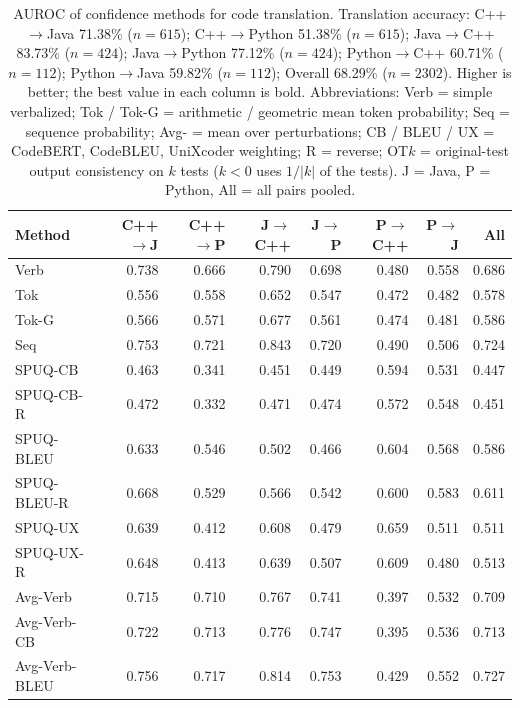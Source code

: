 {\scriptsize
\setlength{\tabcolsep}{2.5pt}
\renewcommand{\arraystretch}{0.95}
\begin{table}[t]
\centering
\caption{AUROC of confidence methods for code translation. Translation accuracy: C++$\rightarrow$Java 71.38\% ($n=615$); C++$\rightarrow$Python 51.38\% ($n=615$); Java$\rightarrow$C++ 83.73\% ($n=424$); Java$\rightarrow$Python 77.12\% ($n=424$); Python$\rightarrow$C++ 60.71\% ($n=112$); Python$\rightarrow$Java 59.82\% ($n=112$); Overall 68.29\% ($n=2302$). Higher is better; the best value in each column is bold. Abbreviations: Verb = simple verbalized; Tok / Tok-G = arithmetic / geometric mean token probability; Seq = sequence probability; Avg- = mean over perturbations; CB / BLEU / UX = CodeBERT, CodeBLEU, UniXcoder weighting; R = reverse; OT$k$ = original-test output consistency on $k$ tests ($k<0$ uses $1/|k|$ of the tests). J = Java, P = Python, All = all pairs pooled.}
\label{tab:translation-auroc}
\begin{tabular}{@{}lrrrrrrr@{}}
\toprule
Method & C++$\to$J & C++$\to$P & J$\to$C++ & J$\to$P & P$\to$C++ & P$\to$J & All \\
\midrule
Verb & 0.738 & 0.666 & 0.790 & 0.698 & 0.480 & 0.558 & 0.686 \\
\addlinespace
Tok & 0.556 & 0.558 & 0.652 & 0.547 & 0.472 & 0.482 & 0.578 \\
Tok-G & 0.566 & 0.571 & 0.677 & 0.561 & 0.474 & 0.481 & 0.586 \\
\addlinespace
Seq & 0.753 & 0.721 & 0.843 & 0.720 & 0.490 & 0.506 & 0.724 \\
\addlinespace
SPUQ-CB & 0.463 & 0.341 & 0.451 & 0.449 & 0.594 & 0.531 & 0.447 \\
SPUQ-CB-R & 0.472 & 0.332 & 0.471 & 0.474 & 0.572 & 0.548 & 0.451 \\
SPUQ-BLEU & 0.633 & 0.546 & 0.502 & 0.466 & 0.604 & 0.568 & 0.586 \\
SPUQ-BLEU-R & 0.668 & 0.529 & 0.566 & 0.542 & 0.600 & 0.583 & 0.611 \\
SPUQ-UX & 0.639 & 0.412 & 0.608 & 0.479 & 0.659 & 0.511 & 0.511 \\
SPUQ-UX-R & 0.648 & 0.413 & 0.639 & 0.507 & 0.609 & 0.480 & 0.513 \\
\addlinespace
Avg-Verb & 0.715 & 0.710 & 0.767 & 0.741 & 0.397 & 0.532 & 0.709 \\
Avg-Verb-CB & 0.722 & 0.713 & 0.776 & 0.747 & 0.395 & 0.536 & 0.713 \\
Avg-Verb-BLEU & 0.756 & 0.717 & 0.814 & 0.753 & 0.429 & 0.552 & 0.727 \\

\end{tabular}
\end{table}}
